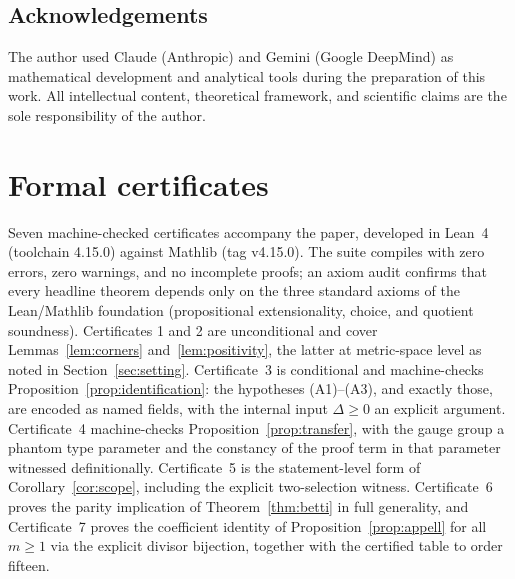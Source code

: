 \documentclass[11pt,a4paper]{article}
\theoremstyle{plain}
\theoremstyle{definition}
\theoremstyle{remark}
\begin{document}
\subsection*{Acknowledgements}

The author used Claude (Anthropic) and Gemini (Google DeepMind) as
mathematical development and analytical tools during the preparation
of this work. All intellectual content, theoretical framework, and
scientific claims are the sole responsibility of the author.

\appendix
\section{Formal certificates}\label{app:lean}

Seven machine-checked certificates accompany the paper, developed in
Lean~4 (toolchain 4.15.0) against Mathlib (tag v4.15.0). The suite
compiles with zero errors, zero warnings, and no incomplete proofs;
an axiom audit confirms that every headline theorem depends only on
the three standard axioms of the Lean/Mathlib foundation
(propositional extensionality, choice, and quotient soundness).
Certificates 1 and 2 are unconditional and cover
Lemmas~\ref{lem:corners} and~\ref{lem:positivity}, the latter at
metric-space level as noted in Section~\ref{sec:setting}.
Certificate~3 is conditional and machine-checks
Proposition~\ref{prop:identification}: the hypotheses (A1)--(A3), and
exactly those, are encoded as named fields, with the internal input
$\Delta \ge 0$ an explicit argument. Certificate~4 machine-checks
Proposition~\ref{prop:transfer}, with the gauge group a phantom type
parameter and the constancy of the proof term in that parameter
witnessed definitionally. Certificate~5 is the statement-level form
of Corollary~\ref{cor:scope}, including the explicit two-selection
witness. Certificate~6 proves the parity implication of
Theorem~\ref{thm:betti} in full generality, and Certificate~7 proves
the coefficient identity of Proposition~\ref{prop:appell} for all
$m \ge 1$ via the explicit divisor bijection, together with the
certified table to order fifteen.
\end{document}
